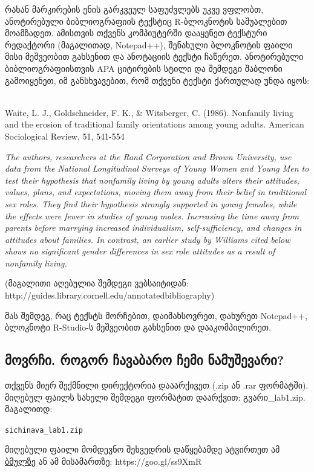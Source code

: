 \documentclass{article}\usepackage[]{graphicx}\usepackage[]{color}
\makeatletter
\newcommand{\hlstd}[1]{\textcolor[rgb]{0.345,0.345,0.345}{#1}}%
\newenvironment{kframe}{%
 \def\at@end@of@kframe{}%
 \ifinner\ifhmode%
  \def\at@end@of@kframe{\end{minipage}}%
  \begin{minipage}{\columnwidth}%
 \fi\fi%
 \def\FrameCommand##1{\hskip\@totalleftmargin \hskip-\fboxsep
 \colorbox{shadecolor}{##1}\hskip-\fboxsep
     \hskip-\linewidth \hskip-\@totalleftmargin \hskip\columnwidth}%
 \MakeFramed {\advance\hsize-\width
   \@totalleftmargin\z@ \linewidth\hsize
   \@setminipage}}%
 {\par\unskip\endMakeFramed%
 \at@end@of@kframe}
\newenvironment{knitrout}{}{} %
\makeatother
\begin{document}
რახან მარკირების ენის გარკვეულ საფუძვლებს უკვე ვფლობთ, ანოტირებული ბიბლიოგრაფიის ტექსტიც R-ბლოკნოტის საშუალებით მოამზადეთ. ამისთვის თქვენს კომპიუტერში დააყენეთ ტექსტური რედაქტორი (მაგალითად, Notepad++), შენახული ბლოკნოტის ფაილი მისი მეშვეობით გახსენით და ანოტაციის ტექსტი ჩაწერეთ. ანოტირებული ბიბლიოგრაფიისთვის APA ციტირების სტილი და შემდეგი შაბლონი გამოიყენეთ, იმ განსხვავებით, რომ თქვენი ტექსტი ქართულად უნდა იყოს:

\\

Waite, L. J., Goldschneider, F. K., & Witsberger, C. (1986). Nonfamily living and the erosion of traditional family orientations among young adults. American Sociological Review, 51, 541-554

\emph{The authors, researchers at the Rand Corporation and Brown University, use data from the National Longitudinal Surveys of Young Women and Young Men to test their hypothesis that nonfamily living by young adults alters their attitudes, values, plans, and expectations, moving them away from their belief in traditional sex roles. They find their hypothesis strongly supported in young females, while the effects were fewer in studies of young males. Increasing the time away from parents before marrying increased individualism, self-sufficiency, and changes in attitudes about families. In contrast, an earlier study by Williams cited below shows no significant gender differences in sex role attitudes as a result of nonfamily living.}


(მაგალითი აღებულია შემდეგი ვებსაიტიდან: http://guides.library.cornell.edu/annotatedbibliography)

მას შემდეგ, რაც ტექსტს მორჩებით, დაიმახსოვრეთ, დახურეთ Notepad++, ბლოკნოტი R-Studio-ს მეშვეობით გახსენით და დააკომპილირეთ.

\subsection*{მოვრჩი. როგორ ჩავაბარო ჩემი ნამუშევარი?}

თქვენს მიერ შექმნილი დირექტორია დააარქივეთ (.zip ან .rar ფორმატში). მიღებულ ფაილს სახელი შემდეგი ფორმატით დაარქვით: გვარი\_lab1.zip. მაგალითდ:
\begin{knitrout}
\color{fgcolor}\begin{kframe}
\begin{alltt}
\hlstd{sichinava_lab1.zip}
\end{alltt}
\end{kframe}
\end{knitrout}

მიღებული ფაილი მომდევნო შეხვედრის დაწყებამდე ატვირთეთ ამ \href{https://www.dropbox.com/request/oUc9abSj2pWwLHgObGV7}{ბმულზე} ან ამ მისამართზე: https://goo.gl/ss9XmR
\end{document}
